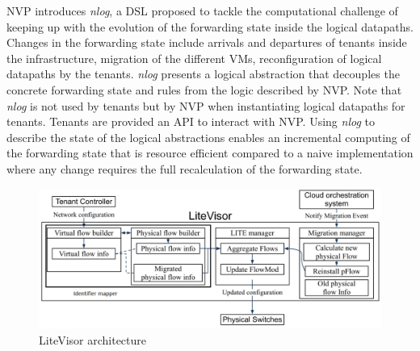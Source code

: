 NVP introduces \textit{nlog}, a DSL proposed to tackle the computational challenge of keeping up with the evolution of the forwarding state inside the logical datapaths. Changes in the forwarding state include arrivals and departures of tenants inside the infrastructure, migration of the different VMs, reconfiguration of logical datapaths by the tenants. \textit{nlog} presents a logical abstraction that decouples the concrete forwarding state and rules from the logic described by NVP. Note that \textit{nlog} is not used by tenants but by NVP when instantiating logical datapaths for tenants.
Tenants are provided an API to interact with NVP.
Using \textit{nlog} to describe the state of the logical abstractions enables an incremental computing of the forwarding state that is resource efficient compared to a naive implementation where any change requires the full recalculation of the forwarding state.



\begin{figure}[ht]
    \centering
    \includegraphics[scale=0.5]{figures/litevisor.pdf}
    \caption{LiteVisor architecture~\cite{Litevisor-Yang2018}}
    \label{fig:litevisor}
\end{figure}

